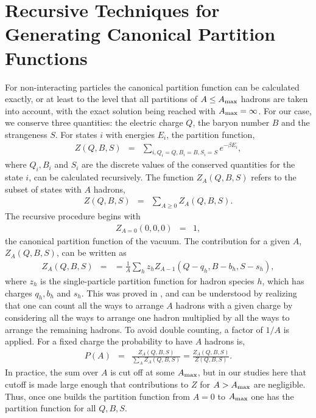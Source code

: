 
\section{Recursive Techniques for Generating Canonical Partition Functions}\label{sec:theoryexact}

For non-interacting particles the canonical partition function can be calculated exactly, or at least to the level that all partitions of $A\le A_{\rm max}$ hadrons are taken into account, with the exact solution being reached with $A_{\rm max}=\infty$. For our case, we conserve three quantities: the electric charge $Q$, the baryon number $B$ and the strangeness $S$. For states $i$ with energies $E_i$, the partition function,
\begin{eqnarray}
Z(Q,B,S)&=&\sum_{i,Q_i=Q,B_i=B,S_i=S}e^{-\beta E_i},
\end{eqnarray}
where $Q_i,B_i$ and $S_i$ are the discrete values of the conserved quantities for the state $i$, can be calculated recursively. The function $Z_A(Q,B,S)$ refers to the subset of states with $A$ hadrons,
\begin{eqnarray}
Z(Q,B,S)&=&\sum_{A\ge 0}Z_A(Q,B,S).
\end{eqnarray}
The recursive procedure begins with
\begin{eqnarray}
Z_{A=0}(0,0,0)&=&1,
\end{eqnarray}
the canonical partition function of the vacuum. The contribution for a given $A$, $Z_A(Q,B,S)$, can be written as 
\begin{eqnarray}\label{eq:recurrence}
Z_A(Q,B,S)&=&=\frac{1}{A}\sum_h z_hZ_{A-1}(Q-q_h,B-b_h,S-s_h),
\end{eqnarray}
where $z_h$ is the single-particle partition function for hadron species $h$, which has charges $q_h,b_h$ and $s_h$. This was proved in \cite{Pratt:1999ht}, and can be understood by realizing that one can count all the ways to arrange $A$ hadrons with a given charge by considering all the ways to arrange one hadron multiplied by all the ways to arrange the remaining hadrons. To avoid double counting, a factor of $1/A$ is applied. For a fixed charge the probability to have $A$ hadrons is,
\begin{eqnarray}
P(A)&=&\frac{Z_A(Q,B,S)}{\sum_A Z_A(Q,B,S)}=\frac{Z_A(Q,B,S)}{Z(Q,B,S)}.
\end{eqnarray}
In practice, the sum over $A$ is cut off at some $A_{\rm max}$, but in our studies here that cutoff is made large enough that contributions to $Z$ for $A>A_{\rm max}$ are negligible. Thus, once one builds the partition function from $A=0$ to $A_{\rm max}$ one has the partition function for all $Q,B,S$. 

